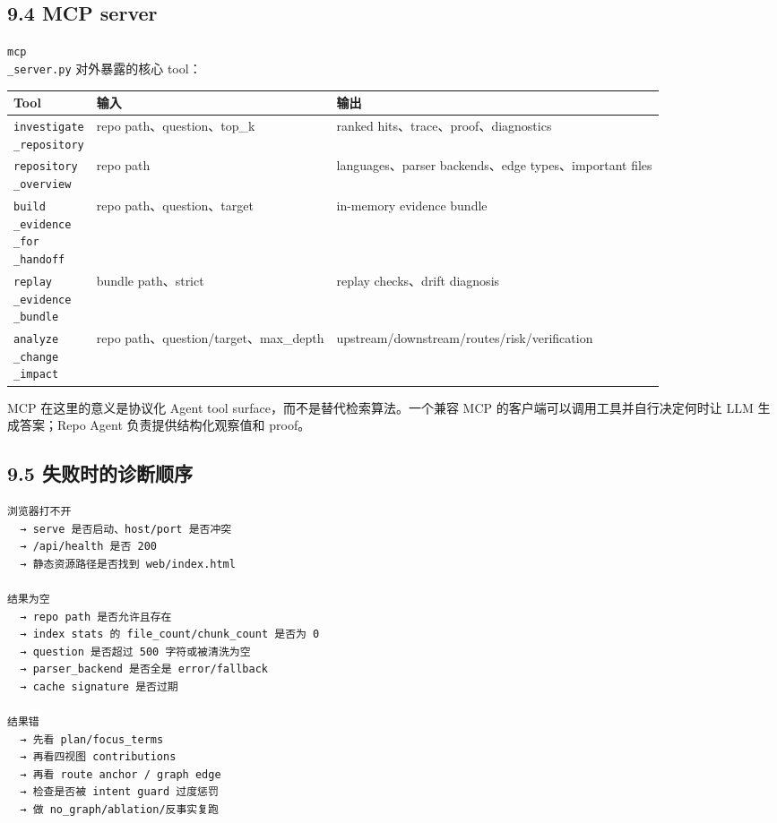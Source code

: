 \documentclass[UTF8,12pt,openany]{ctexbook}
\begin{document}
\subsection{9.4 MCP server}

\texttt{mcp\\_server.py} 对外暴露的核心 tool：\par

\begin{center}
\small
\begin{longtable}{|p{}|p{}|p{}|}
\toprule
Tool & 输入 & 输出 \\
\midrule
\texttt{investigate\\_repository} & repo path、question、top\_k & ranked hits、trace、proof、diagnostics \\
\texttt{repository\\_overview} & repo path & languages、parser backends、edge types、important files \\
\texttt{build\\_evidence\\_for\\_handoff} & repo path、question、target & in-memory evidence bundle \\
\texttt{replay\\_evidence\\_bundle} & bundle path、strict & replay checks、drift diagnosis \\
\texttt{analyze\\_change\\_impact} & repo path、question/target、max\_depth & upstream/downstream/routes/risk/verification \\
\bottomrule
\end{longtable}
\end{center}

MCP 在这里的意义是协议化 Agent tool surface，而不是替代检索算法。一个兼容 MCP 的客户端可以调用工具并自行决定何时让 LLM 生成答案；Repo Agent 负责提供结构化观察值和 proof。\par

\subsection{9.5 失败时的诊断顺序}

\begin{lstlisting}
浏览器打不开
  → serve 是否启动、host/port 是否冲突
  → /api/health 是否 200
  → 静态资源路径是否找到 web/index.html

结果为空
  → repo path 是否允许且存在
  → index stats 的 file_count/chunk_count 是否为 0
  → question 是否超过 500 字符或被清洗为空
  → parser_backend 是否全是 error/fallback
  → cache signature 是否过期

结果错
  → 先看 plan/focus_terms
  → 再看四视图 contributions
  → 再看 route anchor / graph edge
  → 检查是否被 intent guard 过度惩罚
  → 做 no_graph/ablation/反事实复跑
\end{lstlisting}
\end{document}
